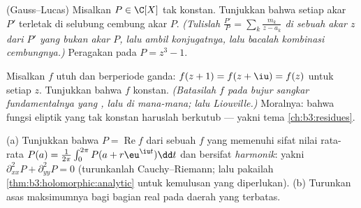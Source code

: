 \begin{exercise}[$\star\star\star$]\label{exo:b3:holomorphic:8}
(Gauss--Lucas) Misalkan $P \in \C[X]$ tak konstan. Tunjukkan bahwa
setiap akar $P'$ terletak di selubung cembung akar
$P$. \emph{(Tulislah $\frac{P'}{P} = \sum_k\frac{m_k}{z - a_k}$
di sebuah akar $z$ dari $P'$ yang bukan akar $P$, lalu ambil
konjugatnya, lalu bacalah kombinasi cembungnya.)} Peragakan pada
$P = z^3 - 1$.
\end{exercise}

\begin{exercise}[$\star\star\star$]\label{exo:b3:holomorphic:9}
Misalkan $f$ utuh dan berperiode ganda: $f(z + 1) = f(z + \iu)
= f(z)$ untuk setiap $z$. Tunjukkan bahwa $f$ konstan. \emph{(Batasilah
$f$ pada bujur sangkar fundamentalnya yang , lalu di mana-mana;
lalu Liouville.)} Moralnya: bahwa fungsi eliptik yang tak konstan haruslah
berkutub --- yakni tema \cref{ch:b3:residues}.
\end{exercise}

\begin{exercise}[$\star\star$]\label{exo:b3:holomorphic:10}
(a) Tunjukkan bahwa $P = \operatorname{Re}f$ dari sebuah $f$ yang 
memenuhi sifat nilai rata-rata $P(a) =
\frac1{2\pi}\int_0^{2\pi}P(a + r\eu^{\iu t})\dd t$ dan bersifat
\emph{harmonik}: yakni $\partial^2_{xx}P + \partial^2_{yy}P = 0$
(turunkanlah Cauchy--Riemann; lalu pakailah
\cref{thm:b3:holomorphic:analytic} untuk kemulusan yang diperlukan).
(b) Turunkan asas maksimumnya bagi bagian real  pada daerah yang terbatas.
\end{exercise}

